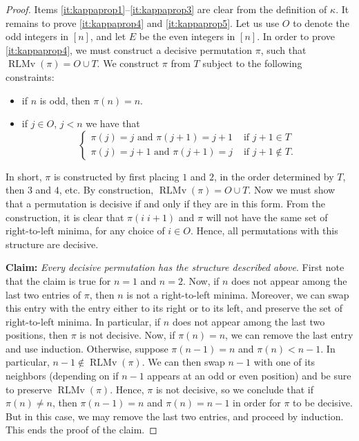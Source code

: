\documentclass[reqno]{amsart}
\theoremstyle{definition}
\DeclareMathOperator{\RLMv}{RLMv}
\begin{document}
\begin{proof}
Items \ref{it:kappaprop1}--\ref{it:kappaprop3} are clear from the definition of $\kappa$.
%
It remains to prove \ref{it:kappaprop4} and \ref{it:kappaprop5}.
Let us use $O$ to denote the odd integers in $[n]$, and let $E$
be the even integers in $[n]$.
%
In order to prove \ref{it:kappaprop4}, we must construct a decisive permutation $\pi$,
such that $\RLMv(\pi) = O \cup T$. We construct $\pi$ from $T$
subject to the following constraints:
\begin{itemize}
\item if $n$ is odd, then $\pi(n)=n$.
\item if $j \in O$, $j<n$ we have that
\[
\begin{cases}
\pi(j) =j \text{ and } \pi(j+1) = j+1 &\text{ if } j+1 \in T \\
\pi(j) =j+1 \text{ and } \pi(j+1) = j &\text{ if } j+1 \notin T.
\end{cases}
\]
\end{itemize}
In short, $\pi$ is constructed by first placing $1$ and $2$,
in the order determined by $T$, then $3$ and $4$, etc.
By construction, $\RLMv(\pi) = O \cup T$.
Now we must show that a permutation is decisive if and only if they
are in this form. From the construction, it is clear that
$\pi (i\; i+1)$ and $\pi$ will not have the same set of right-to-left minima,
for any choice of $i \in O$. Hence, all permutations with this structure are decisive.
\medskip

\textbf{Claim:} \emph{Every decisive permutation has the structure described above}.
First note that the claim is true for $n=1$ and $n=2$.
Now, if $n$ does not appear among the last two entries of $\pi$,
then $n$ is not a right-to-left minima. Moreover, we can swap this entry 
with the entry either to its right or to its left, and preserve the 
set of right-to-left minima. 
In particular, if $n$ does not appear among the last two positions,
then $\pi$ is not decisive. Now, if $\pi(n)=n$, we can remove 
the last entry and use induction.
Otherwise, suppose $\pi(n-1)=n$ and $\pi(n)<n-1$. In particular,
$n-1 \notin \RLMv(\pi)$.
We can then swap $n-1$ with one of its neighbors (depending on if $n-1$
appears at an odd or even position) and be sure to preserve $\RLMv(\pi)$.
Hence, $\pi$ is not decisive, so we conclude that if 
$\pi(n) \neq n$, then $\pi(n-1)=n$ and $\pi(n)=n-1$ in order for $\pi$
to be decisive. But in this case, we may remove the last two entries,
and proceed by induction. This ends the proof of the claim.
\smallskip 



\end{proof}
\end{document}
